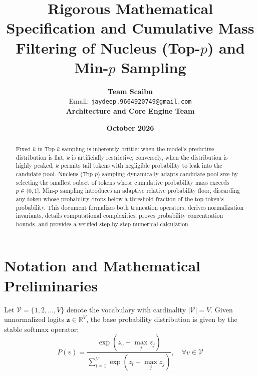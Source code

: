 \documentclass[11pt,a4paper]{article}
\title{\textbf{Rigorous Mathematical Specification and Cumulative Mass Filtering of Nucleus (Top-$p$) and Min-$p$ Sampling}}
\author{\textbf{Team Scaibu} \\ \small Email: \texttt{jaydeep.9664920749@gmail.com} \\ \small \textbf{Architecture and Core Engine Team}}
\date{\textbf{October 2026}}
\theoremstyle{definition}
\begin{document}
\maketitle

\begin{abstract}
Fixed $k$ in Top-$k$ sampling is inherently brittle: when the model's predictive distribution is flat, $k$ is artificially restrictive; conversely, when the distribution is highly peaked, $k$ permits tail tokens with negligible probability to leak into the candidate pool. Nucleus (Top-$p$) sampling dynamically adapts candidate pool size by selecting the smallest subset of tokens whose cumulative probability mass exceeds $p \in (0, 1]$. Min-$p$ sampling introduces an adaptive relative probability floor, discarding any token whose probability drops below a threshold fraction of the top token's probability. This document formalizes both truncation operators, derives normalization invariants, details computational complexities, proves probability concentration bounds, and provides a verified step-by-step numerical calculation.
\end{abstract}

\section{Notation and Mathematical Preliminaries}

Let $\mathcal{V} = \{1, 2, \dots, V\}$ denote the vocabulary with cardinality $|\mathcal{V}| = V$. Given unnormalized logits $\mathbf{z} \in \mathbb{R}^V$, the base probability distribution is given by the stable softmax operator:
\begin{equation}
P(v) = \frac{\exp(z_v - \max_{j} z_j)}{\sum_{l=1}^V \exp(z_l - \max_{j} z_j)}, \quad \forall v \in \mathcal{V}
\end{equation}
\end{document}
